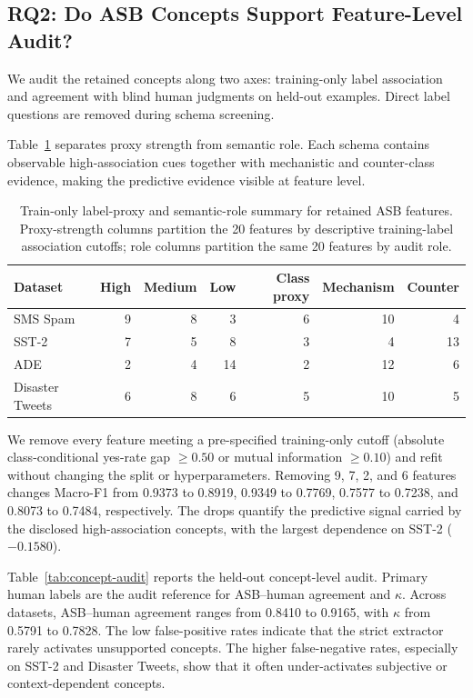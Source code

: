 \documentclass[runningheads]{llncs}
\begin{document}
\subsection{RQ2: Do ASB Concepts Support Feature-Level Audit?}

We audit the retained concepts along two axes: training-only label association and agreement with blind human judgments on held-out examples. Direct label questions are removed during schema screening.

Table~\ref{tab:proxy-summary} separates proxy strength from semantic role. Each schema contains observable high-association cues together with mechanistic and counter-class evidence, making the predictive evidence visible at feature level.

\begin{table}
\centering
\caption{Train-only label-proxy and semantic-role summary for retained ASB features. Proxy-strength columns partition the 20 features by descriptive training-label association cutoffs; role columns partition the same 20 features by audit role.}
\label{tab:proxy-summary}
\begin{tabular}{lrrrrrr}
\toprule
Dataset & High & Medium & Low & Class proxy & Mechanism & Counter \\
\midrule
SMS Spam & 9 & 8 & 3 & 6 & 10 & 4 \\
SST-2 & 7 & 5 & 8 & 3 & 4 & 13 \\
ADE & 2 & 4 & 14 & 2 & 12 & 6 \\
Disaster Tweets & 6 & 8 & 6 & 5 & 10 & 5 \\
\bottomrule
\end{tabular}
\end{table}

We remove every feature meeting a pre-specified training-only cutoff (absolute class-conditional yes-rate gap $\geq 0.50$ or mutual information $\geq 0.10$) and refit without changing the split or hyperparameters. Removing 9, 7, 2, and 6 features changes Macro-F1 from 0.9373 to 0.8919, 0.9349 to 0.7769, 0.7577 to 0.7238, and 0.8073 to 0.7484, respectively. The drops quantify the predictive signal carried by the disclosed high-association concepts, with the largest dependence on SST-2 ($-0.1580$).

Table~\ref{tab:concept-audit} reports the held-out concept-level audit. Primary human labels are the audit reference for ASB--human agreement and $\kappa$. Across datasets, ASB--human agreement ranges from 0.8410 to 0.9165, with $\kappa$ from 0.5791 to 0.7828. The low false-positive rates indicate that the strict extractor rarely activates unsupported concepts. The higher false-negative rates, especially on SST-2 and Disaster Tweets, show that it often under-activates subjective or context-dependent concepts.
\end{document}
